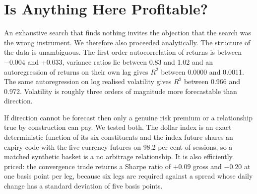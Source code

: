 \documentclass[10pt]{article}
\begin{document}
\begin{table}[H]
\caption{Family ensembles, equal weight within each family, costed in weight space so that
trades offsetting across members are not charged. Selecting nothing means no correction is
required, so these are the fair test of whether a family of ideas has value.}
\label{tab:families}
\end{table}

\section{Is Anything Here Profitable?}\label{sec:structure}

An exhaustive search that finds nothing invites the objection that the search was the wrong
instrument. We therefore also proceeded analytically. The structure of the data is
unambiguous. The first order autocorrelation of returns is between $-0.004$ and $+0.033$,
variance ratios lie between 0.83 and 1.02 and an autoregression of returns on their own
lag gives $R^2$ between 0.0000 and 0.0011. The same autoregression on log realised
volatility gives $R^2$ between 0.966 and 0.972. Volatility is roughly three orders of
magnitude more forecastable than direction.

If direction cannot be forecast then only a genuine risk premium or a relationship true by
construction can pay. We tested both. The dollar index is an exact deterministic function
of its six constituents and the index future shares an expiry code with the five currency
futures on 98.2 per cent of sessions, so a matched synthetic basket is a no arbitrage
relationship. It is also efficiently priced: the convergence trade returns a Sharpe ratio
of $+0.09$ gross and $-0.20$ at one basis point per leg, because six legs are required
against a spread whose daily change has a standard deviation of five basis points.
\end{document}
